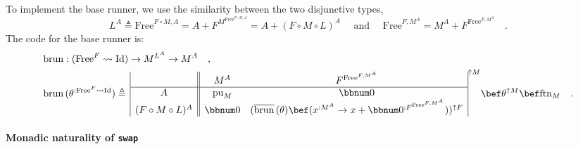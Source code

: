 To implement the base runner, we use the similarity between the two
disjunctive types,
\[
L^{A}\triangleq\text{Free}^{F\circ M,A}=A+F^{M^{\text{Free}^{F\circ M,A}}}=A+(F\circ M\circ L)^{A}\quad\text{ and }\quad\text{Free}^{F,M^{A}}=M^{A}+F^{\text{Free}^{F,M^{A}}}\quad.
\]
The code for the base runner is:
\begin{align*}
 & \text{brun}:(\text{Free}^{F}\leadsto\text{Id})\rightarrow M^{L^{A}}\rightarrow M^{A}\quad,\\
 & \text{brun}\,(\theta^{:\text{Free}^{F}\leadsto\text{Id}})\triangleq\,\begin{array}{|c||cc|}
 & M^{A} & F^{\text{Free}^{F,M^{A}}}\\
\hline A & \text{pu}_{M} & \bbnum 0\\
(F\circ M\circ L)^{A} & \bbnum 0 & (\overline{\text{brun}}\,(\theta)\bef(x^{:M^{A}}\rightarrow x+\bbnum 0^{:F^{\text{Free}^{F,M^{A}}}}))^{\uparrow F}
\end{array}^{\uparrow M}\bef\theta^{\uparrow M}\bef\text{ftn}_{M}\quad.
\end{align*}


\paragraph{Monadic naturality of \texttt{swap}}

